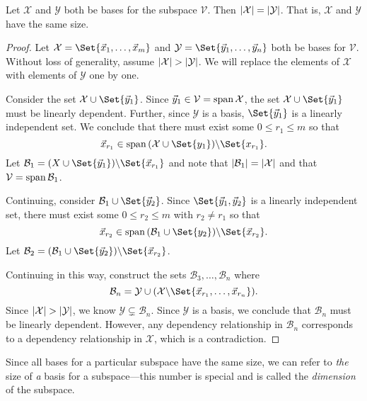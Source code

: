 	\begin{theorem}
		Let $\mathcal X$ and $\mathcal Y$ both be bases
		for the subspace $\mathcal V$. Then $\lvert\mathcal X\rvert=\lvert\mathcal Y\rvert$.
		That is, $\mathcal X$ and $\mathcal Y$ have the same size.
	\end{theorem}
	\begin{proof}
		Let $\mathcal X=\Set{\vec x_1,\ldots, \vec x_m}$ and $\mathcal Y=\Set{\vec y_1,
		\ldots,\vec y_n}$ both be bases for $\mathcal V$.
		Without loss of generality, assume $\lvert\mathcal X\rvert>\lvert\mathcal Y\rvert$.
		We will replace the elements of $\mathcal X$ with elements of $\mathcal Y$
		one by one.

		Consider the set $\mathcal X\cup\Set{\vec y_1}$. Since
		$\vec y_1\in\mathcal V=\operatorname{span}\mathcal X$, the set
		$\mathcal X\cup\Set{\vec y_1}$ must be linearly dependent.
		Further, since $\mathcal Y$ is a basis, $\Set{\vec y_1}$ is a linearly
		independent set. We conclude that there must exist some $0\leq {r_1}\leq m$
		so that
		\[
			\vec x_{r_1}\in\Span\, (\mathcal X\cup\Set{y_1})\backslash \Set{x_{r_1}}.
		\]
		Let $\mathcal B_1=(X\cup\Set{\vec y_1})\backslash \Set{\vec x_{r_1}}$ and note that
		$\lvert\mathcal B_1\rvert=\lvert\mathcal X\rvert$ and that $\mathcal V=\operatorname{span}\mathcal B_1$.

		Continuing, consider $\mathcal B_1\cup\Set{\vec y_2}$. Since $\Set{\vec y_1,\vec y_2}$
		is a linearly independent set, there must exist some $0\leq r_2\leq m$ with $r_2\neq r_1$
		so that
		\[
			\vec x_{r_2}\in\Span\, (\mathcal B_1\cup\Set{y_2})\backslash \Set{\vec x_{r_2}}.
		\]
		Let $\mathcal B_2=(\mathcal B_1\cup\Set{\vec y_2})\backslash \Set{\vec x_{r_2}}$.

		Continuing in this way, construct the sets $\mathcal B_3,\ldots,\mathcal B_n$ where
		\[
			\mathcal B_n=\mathcal Y\cup (\mathcal X\backslash \Set{\vec x_{r_1},\ldots,\vec x_{r_n}}).
		\]
		Since $\lvert\mathcal X\rvert>\lvert\mathcal Y\rvert$, we know $\mathcal Y\subsetneq \mathcal B_n$.
		Since $\mathcal Y$ is a basis, we conclude that $\mathcal B_n$ must be 
		linearly dependent. However, any dependency relationship in $\mathcal B_n$ corresponds
		to a dependency relationship in $\mathcal X$, which is a contradiction.
	\end{proof}

	Since all bases for a particular subspace have the same size, we can
	refer to \emph{the} size of \emph{a} basis for a subspace---this number is special
	and is called the \emph{dimension} of the subspace.

